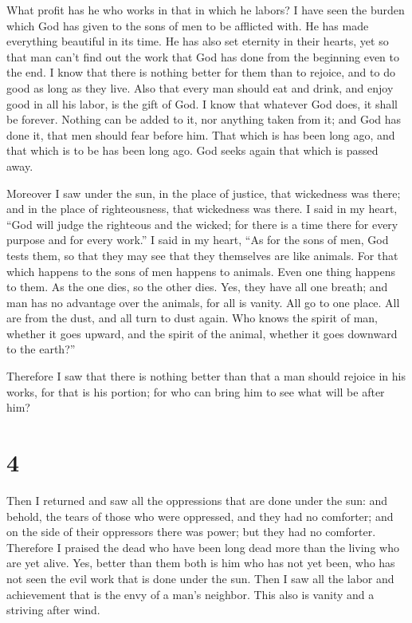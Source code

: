  What profit has he who works in that in which he labors?
 I have seen the burden which God has given to the sons of
men to be afflicted with.  He has made everything beautiful
in its time. He has also set eternity in their hearts, yet so that man
can't find out the work that God has done from the beginning even to the
end.  I know that there is nothing better for them than to
rejoice, and to do good as long as they live.  Also that
every man should eat and drink, and enjoy good in all his labor, is the
gift of God.  I know that whatever God does, it shall be
forever. Nothing can be added to it, nor anything taken from it; and God
has done it, that men should fear before him.  That which
is has been long ago, and that which is to be has been long ago. God
seeks again that which is passed away.

 Moreover I saw under the sun, in the place of justice,
that wickedness was there; and in the place of righteousness, that
wickedness was there.  I said in my heart, ``God will judge
the righteous and the wicked; for there is a time there for every
purpose and for every work.''  I said in my heart, ``As for
the sons of men, God tests them, so that they may see that they
themselves are like animals.  For that which happens to the
sons of men happens to animals. Even one thing happens to them. As the
one dies, so the other dies. Yes, they have all one breath; and man has
no advantage over the animals, for all is vanity.  All go
to one place. All are from the dust, and all turn to dust again.
 Who knows the spirit of man, whether it goes upward, and
the spirit of the animal, whether it goes downward to the earth?''

 Therefore I saw that there is nothing better than that a
man should rejoice in his works, for that is his portion; for who can
bring him to see what will be after him?

\hypertarget{section-3}{%
\section{4}\label{section-3}}

 Then I returned and saw all the oppressions that are done
under the sun: and behold, the tears of those who were oppressed, and
they had no comforter; and on the side of their oppressors there was
power; but they had no comforter.  Therefore I praised the
dead who have been long dead more than the living who are yet alive.
 Yes, better than them both is him who has not yet been, who
has not seen the evil work that is done under the sun.  Then
I saw all the labor and achievement that is the envy of a man's
neighbor. This also is vanity and a striving after wind.

